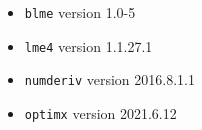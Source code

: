 \documentclass[11pt, a4paper]{article}
\newcommand{\PS}[1]{{\noindent \color{red} \bf \#PS: #1}}
\theoremstyle{example} \newtheorem{example}{Example}[section]
\theoremstyle{theorem} \newtheorem{theorem}{Theorem}[section]
\theoremstyle{theorem }\newtheorem{proposition}{Proposition}[section]
\theoremstyle{theorem }\newtheorem{corollary}{Corollary}[section]
\begin{document}
	\begin{itemize}
		\item \texttt{blme} \citep{chung+etal:2013} version 1.0-5 
		\item \texttt{lme4} \citep{bates+etal:2015} version 1.1.27.1
		\item \texttt{numderiv} \citep{gilbert+varadhan:2019} version 2016.8.1.1
		\item \texttt{optimx} \citep{nash+varadhan:2011} version 2021.6.12
	\end{itemize}
\newpage
\end{document}

